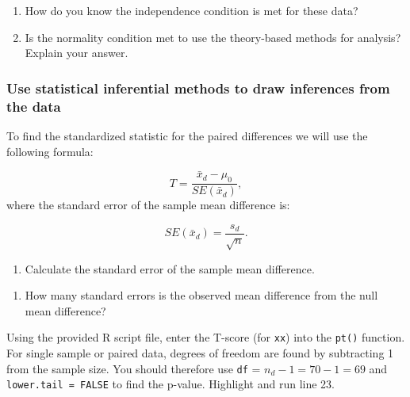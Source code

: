 \documentclass[
]{report}
\providecommand{\tightlist}{%
  \setlength{\itemsep}{0pt}\setlength{\parskip}{0pt}}
\begin{document}
\begin{enumerate}
\def\labelenumi{\arabic{enumi}.}
\setcounter{enumi}{4}
\item
  How do you know the independence condition is met for these data?
  \vspace{0.8in}
\item
  Is the normality condition met to use the theory-based methods for analysis? Explain your answer.
  \vspace{1in}
\end{enumerate}

\hypertarget{use-statistical-inferential-methods-to-draw-inferences-from-the-data-1}{%
\subsubsection*{Use statistical inferential methods to draw inferences from the data}\label{use-statistical-inferential-methods-to-draw-inferences-from-the-data-1}}

To find the standardized statistic for the paired differences we will use the following formula:

\[T = \frac{\bar{x}_d - \mu_0}{SE(\bar{x}_d)},\]
where the standard error of the sample mean difference is:

\[SE(\bar{x}_d)=\frac{s_d}{\sqrt{n}}.\]

\begin{enumerate}
\def\labelenumi{\arabic{enumi}.}
\setcounter{enumi}{6}
\tightlist
\item
  Calculate the standard error of the sample mean difference.
\end{enumerate}

\vspace{0.5in}

\begin{enumerate}
\def\labelenumi{\arabic{enumi}.}
\setcounter{enumi}{7}
\tightlist
\item
  How many standard errors is the observed mean difference from the null mean difference?
\end{enumerate}

\vspace{0.5in}

Using the provided R script file, enter the T-score (for \texttt{xx}) into the \texttt{pt()} function. For single sample or paired data, degrees of freedom are found by subtracting 1 from the sample size. You should therefore use \texttt{df} = \(n_d-1 = 70 - 1 = 69\) and \texttt{lower.tail\ =\ FALSE} to find the p-value. Highlight and run line 23.
\end{document}
